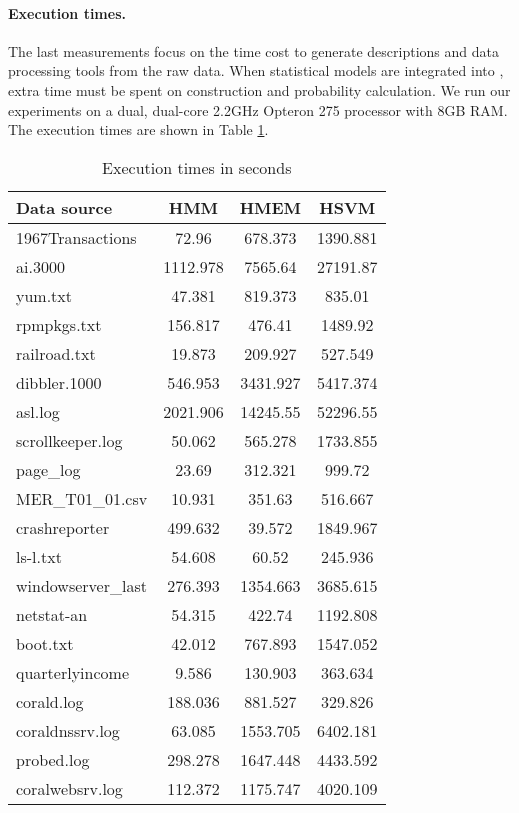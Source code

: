 \paragraph*{Execution times.}

The last measurements focus on the time cost to generate descriptions
and data processing tools from the raw data. When statistical models
are integrated into \learnpads{}, extra time must be spent on
\seqset{} construction and probability calculation. We run our
experiments on a dual, dual-core 2.2GHz Opteron 275 processor with 8GB
RAM. The execution times are shown in Table \ref{tab:time}.

\begin{table}
\begin{center}
\begin{tabular}{|l||c|c|c|}\hline
Data source & HMM & HMEM & HSVM \\ \hline 
1967Transactions & 72.96 & 678.373 & 1390.881   \\\hline 
ai.3000 & 1112.978 & 7565.64 & 27191.87 \\ \hline
yum.txt & 47.381 &  819.373 & 835.01\\ \hline
rpmpkgs.txt & 156.817 & 476.41 & 1489.92\\ \hline
railroad.txt & 19.873 & 209.927 & 527.549  \\ \hline
dibbler.1000 & 546.953 & 3431.927 & 5417.374   \\ \hline
asl.log & 2021.906 & 14245.55 & 52296.55 \\ \hline
scrollkeeper.log  &  50.062 & 565.278 & 1733.855 \\ \hline
page\_log  & 23.69 & 312.321 & 999.72 \\ \hline
MER\_T01\_01.csv & 10.931 & 351.63 & 516.667 \\ \hline
crashreporter & 499.632 & 39.572 & 1849.967 \\ \hline
ls-l.txt & 54.608 & 60.52 & 245.936 \\ \hline
windowserver\_last & 276.393 & 1354.663 & 3685.615 \\ \hline
netstat-an & 54.315 & 422.74 & 1192.808 \\ \hline
boot.txt & 42.012 &  767.893 & 1547.052 \\ \hline
quarterlyincome & 9.586 & 130.903 & 363.634   \\ \hline
corald.log & 188.036 &  881.527 & 329.826 \\ \hline
coraldnssrv.log  & 63.085 &  1553.705 & 6402.181\\ \hline
probed.log & 298.278 & 1647.448 & 4433.592 \\ \hline
coralwebsrv.log & 112.372 & 1175.747 & 4020.109 \\\hline
\end{tabular}
\caption{Execution times in seconds}
\label{tab:time}
\end{center}
\end{table}

